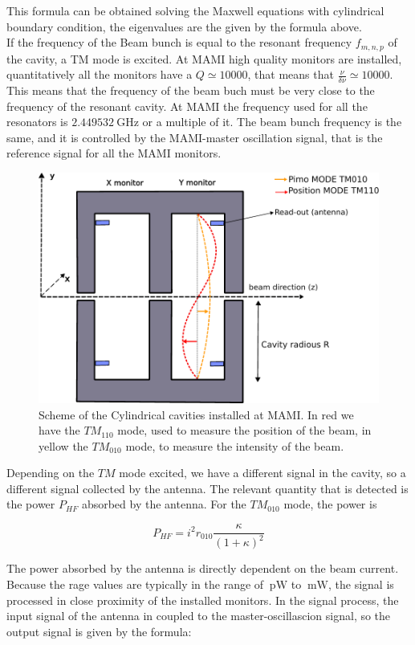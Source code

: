 This formula can be obtained solving the Maxwell equations with cylindrical boundary condition, the eigenvalues are the given by the formula above. \\
If the frequency of the Beam bunch is equal to the resonant frequency $f_{m,n,p}$ of the cavity, a TM mode is excited. At MAMI high quality monitors are installed, quantitatively all the monitors have a $Q \simeq 10000$, that means that $\frac{\nu}{\delta \nu} \simeq 10000$. This means that the frequency of the beam buch must be very close to the frequency of the resonant cavity. At MAMI the frequency used for all the resonators is $\SI{2.449532}{\giga \hertz}$ or a multiple of it. The beam bunch frequency is the same, and it is controlled by the MAMI-master oscillation signal, that is the reference signal for all the MAMI monitors.

\begin{figure}[hbtp]
\centering
\includegraphics[width = 0.6 \textwidth]{ExperimentalSetup/Monitors.pdf}
\caption{Scheme of the Cylindrical cavities installed at MAMI. In red we have the $TM_{110}$ mode, used to measure the position of the beam, in yellow the $TM_{010}$ mode, to measure the intensity of the beam.}
\end{figure}

Depending on the $TM$ mode excited, we have a different signal in the cavity, so a different signal collected by the antenna. The relevant quantity that is detected is the power $P_{HF}$ absorbed by the antenna. For the $TM_{010}$ mode, the power is 

\begin{equation}
P_{HF} = i^{2} r_{010} \frac{\kappa}{(1 + \kappa)^{2}}
\end{equation}

The power absorbed by the antenna is directly dependent on the beam current. Because the rage values are typically in the range of $\SI{}{\pico \watt}$ to $\SI{}{\milli \watt }$, the signal is processed in close proximity of the installed monitors. In the signal process, the input signal of the antenna in coupled to the master-oscillascion signal, so the output signal is given by the formula:

